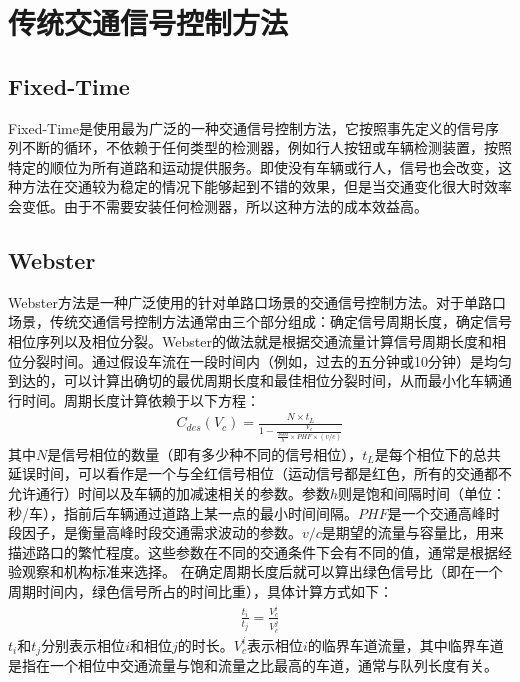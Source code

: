 \section{传统交通信号控制方法}
\subsection{Fixed-Time}
Fixed-Time\cite{miller1963settings}是使用最为广泛的一种交通信号控制方法，它按照事先定义的信号序列不断的循环，不依赖于任何类型的检测器，例如行人按钮或车辆检测装置，按照特定的顺位为所有道路和运动提供服务。即使没有车辆或行人，信号也会改变，这种方法在交通较为稳定的情况下能够起到不错的效果，但是当交通变化很大时效率会变低。由于不需要安装任何检测器，所以这种方法的成本效益高。

\subsection{Webster}
Webster\cite{koonce2008traffic}方法是一种广泛使用的针对单路口场景的交通信号控制方法。对于单路口场景，传统交通信号控制方法通常由三个部分组成：确定信号周期长度，确定信号相位序列以及相位分裂。Webster的做法就是根据交通流量计算信号周期长度和相位分裂时间。通过假设车流在一段时间内（例如，过去的五分钟或10分钟）是均匀到达的，可以计算出确切的最优周期长度和最佳相位分裂时间，从而最小化车辆通行时间。周期长度计算依赖于以下方程：
\begin{align}
    C_{d e s}\left(V_{c}\right)=\frac{N \times t_{L}}{1-\frac{V_{c}}{\frac{3600}{h} \times P H F \times(v / c)}}
\end{align}
其中$N$是信号相位的数量（即有多少种不同的信号相位），$t_{L}$是每个相位下的总共延误时间，可以看作是一个与全红信号相位（运动信号都是红色，所有的交通都不允许通行）时间以及车辆的加减速相关的参数。参数$h$则是饱和间隔时间（单位：秒/车），指前后车辆通过道路上某一点的最小时间间隔。$PHF$是一个交通高峰时段因子，是衡量高峰时段交通需求波动的参数。$v / c$是期望的流量与容量比，用来描述路口的繁忙程度。这些参数在不同的交通条件下会有不同的值，通常是根据经验观察和机构标准来选择。
在确定周期长度后就可以算出绿色信号比（即在一个周期时间内，绿色信号所占的时间比重），具体计算方式如下：
\begin{align}
    \frac{t_{i}}{t_{j}}=\frac{V_{c}^{i}}{V_{c}^{j}}
\end{align}
$t_i \text{和} t_j$分别表示相位$i$和相位$j$的时长。$V_c^i$表示相位$i$的临界车道流量，其中临界车道是指在一个相位中交通流量与饱和流量之比最高的车道，通常与队列长度有关。

